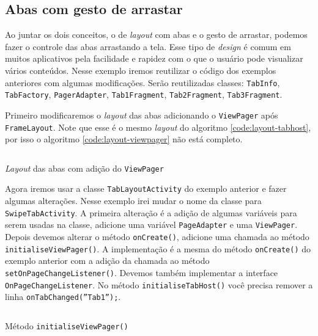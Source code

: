 \documentclass[a4paper,12pt,brazil]{book}
\begin{document}
\begin{singlespace}
\section{Abas com gesto de arrastar}

	Ao juntar os dois conceitos, o de \emph{layout} com abas e o gesto de arrastar, podemos fazer o controle das abas arrastando a tela. Esse tipo de \emph{design} é comum em muitos aplicativos pela facilidade e rapidez com o que o usuário pode visualizar vários conteúdos. 
	Nesse exemplo iremos reutilizar o código dos exemplos anteriores com algumas modificações. Serão reutilizadas classes: \texttt{TabInfo}, \texttt{TabFactory}, \texttt{PagerAdapter}, \texttt{Tab1Fragment}, \texttt{Tab2Fragment}, \texttt{Tab3Fragment}.
	
	Primeiro modificaremos o \emph{layout} das abas adicionando o \texttt{ViewPager} após \texttt{FrameLayout}. Note que esse é o mesmo \emph{layout} do algoritmo \ref{code:layout-tabhost}, por isso o algoritmo \ref{code:layout-viewpager} não está completo.
	
	\begin{listing}[H]
	\inputminted[linenos=true,fontsize=\small,frame=lines, framesep=2mm, tabsize=2,numbersep=5pt]{xml}{src/design/swipetabs-layout.xml}
	\caption{\emph{Layout} das abas com adição do \texttt{ViewPager}}
	\label{code:layout-viewpager}
	\end{listing}
	
	Agora iremos usar a classe \texttt{TabLayoutActivity} do exemplo anterior e fazer algumas alterações.  Nesse exemplo irei mudar o nome da classe para \texttt{SwipeTabActivity}. A primeira alteração é a adição de algumas variáveis para serem usadas na classe, adicione uma variável \texttt{PageAdapter} e uma \texttt{ViewPager}. Depois devemos alterar o método \texttt{onCreate()}, adicione uma chamada ao método \texttt{initialiseViewPager()}. A implementação é a mesma do método \texttt{onCreate()} do exemplo anterior com a adição da chamada ao método \texttt{setOnPageChangeListener()}. Devemos também implementar a interface \texttt{OnPageChangeListener}. No método \texttt{initialiseTabHost()} você precisa remover a linha \texttt{onTabChanged(''Tab1'');}.
	
	\begin{listing}[H]
	\inputminted[linenos=true,fontsize=\small,frame=lines, framesep=2mm, tabsize=2,numbersep=5pt]{java}{src/design/initialiseviewpager.java}
	\caption{Método \texttt{initialiseViewPager()}}
	\end{listing}
	

\end{singlespace}
\end{document}
